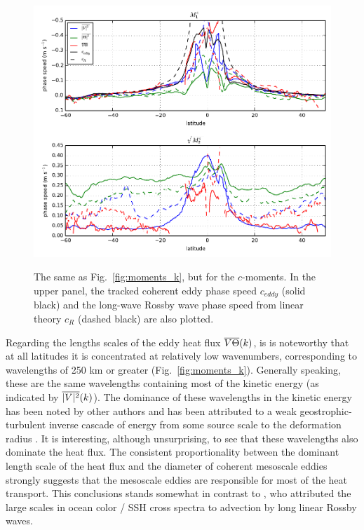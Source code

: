 \documentclass[10pt]{article}
\newcommand{\ol}{\ensuremath{\overline}}
\begin{document}
\begin{figure}[t]
  \noindent\includegraphics{../figures/moments_c.pdf}\\
  \caption{The same as Fig.~\ref{fig:moments_k}, but for the $c$-moments. In the upper panel, the tracked coherent eddy phase speed $c_{eddy}$ (solid black) and the long-wave Rossby wave phase speed from linear theory $c_R$ (dashed black) are also plotted. }
  \label{fig:moments_c}
\end{figure}

Regarding the lengths scales of the eddy heat flux $\ol{V\Theta}(k)$, is is noteworthy that at all latitudes it is concentrated at relatively low wavenumbers, corresponding to wavelengths of 250 km or greater (Fig.~\ref{fig:moments_k}). Generally speaking, these are the same wavelengths containing most of the kinetic energy (as indicated by $\ol{|V|^2}(k)$). The dominance of these wavelengths in the kinetic energy has been noted by other authors \citep[e.g.][]{Wunsch2010,WorthamWunsch2014} and has been attributed to a weak geostrophic-turbulent inverse cascade of energy from some source scale to the deformation radius \citep{Stammer1997,ArbicFlierl2004,ScottWang2005,TullochEtAl2011}. It is interesting, although unsurprising, to see that these wavelengths also dominate the heat flux. The consistent proportionality between the dominant length scale of the heat flux and the diameter of coherent mesoscale eddies strongly suggests that the mesoscale eddies are responsible for most of the heat transport. This conclusions stands somewhat in contrast to \citet{KillworthEtAl2004}, who attributed the large scales in ocean color / SSH cross spectra to advection by long linear Rossby waves.
\end{document}
